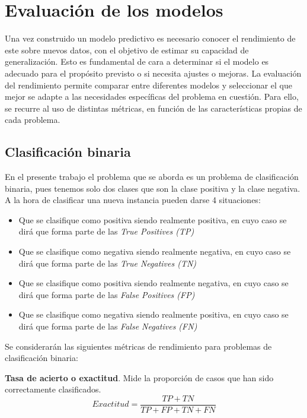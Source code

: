 \documentclass[12pt,a4paper,]{book}
\numberwithin{dummy}{section}
\theoremstyle{ocrenumbox}
\theoremstyle{blacknumex}
\theoremstyle{blacknumbox}
\theoremstyle{ocrenum}
\theoremstyle{ocrenum}
\begin{document}
\hypertarget{evaluaciuxf3n-de-los-modelos}{%
\section{Evaluación de los modelos}\label{evaluaciuxf3n-de-los-modelos}}

Una vez construido un modelo predictivo es necesario conocer el
rendimiento de este sobre nuevos datos, con el objetivo de estimar su
capacidad de generalización. Esto es fundamental de cara a determinar si
el modelo es adecuado para el propósito previsto o si necesita ajustes o
mejoras. La evaluación del rendimiento permite comparar entre diferentes
modelos y seleccionar el que mejor se adapte a las necesidades
específicas del problema en cuestión. Para ello, se recurre al uso de
distintas métricas, en función de las características propias de cada
problema.

\hypertarget{clasificaciuxf3n-binaria}{%
\subsection{Clasificación binaria}\label{clasificaciuxf3n-binaria}}

En el presente trabajo el problema que se aborda es un problema de
clasificación binaria, pues tenemos solo dos clases que son la clase
positiva y la clase negativa. A la hora de clasificar una nueva
instancia pueden darse 4 situaciones:

\begin{itemize}
\item
  Que se clasifique como positiva siendo realmente positiva, en cuyo
  caso se dirá que forma parte de las \emph{True Positives (TP)}
\item
  Que se clasifique como negativa siendo realmente negativa, en cuyo
  caso se dirá que forma parte de las \emph{True Negatives (TN)}
\item
  Que se clasifique como positiva siendo realmente negativa, en cuyo
  caso se dirá que forma parte de las \emph{False Positives (FP)}
\item
  Que se clasifique como negativa siendo realmente positiva, en cuyo
  caso se dirá que forma parte de las \emph{False Negatives (FN)}
\end{itemize}

Se considerarán las siguientes métricas de rendimiento para problemas de
clasificación binaria:

\textbf{Tasa de acierto o exactitud}. Mide la proporción de casos que
han sido correctamente clasificados.
\[Exactitud = \frac{TP + TN}{TP + FP + TN + FN}\]
\end{document}
